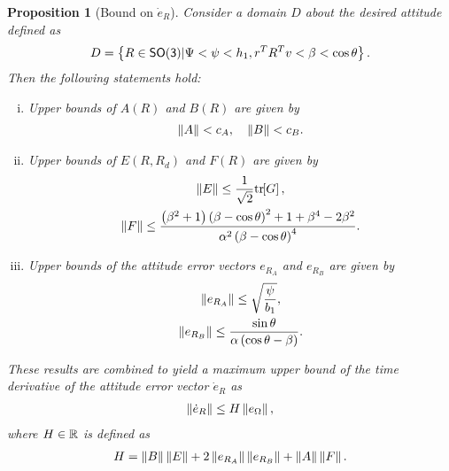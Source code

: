 \documentclass[letterpaper, 10 pt, conference]{ieeeconf}  %
\newtheorem{prop}{Proposition}
\begin{document}
\begin{prop}[Bound on \( \dot{e}_R \)]\label{prop:eR_dot_bound}
Consider a domain \( D \) about the desired attitude defined as
\begin{align}
	D = \left\{ R \in \mathsf{SO(3)} \vert \Psi < \psi < h_1, r^T R^T v < \beta < \cos \theta \right\}. \label{eqn:domain}
\end{align}
Then the following statements hold:
\begin{enumerate}[(i)]
	\item \label{item:prop_eR_dot_bound_AB} Upper bounds of \( A(R) \) and \( B(R) \) are given by
	\begin{gather}
		\left\| A \right\| < c_A  , \quad \left\| B \right\| < c_B . \label{eqn:AB_bound}
	\end{gather}
	\item \label{item:prop_eR_dot_bound_EF} Upper bounds of \( E(R,R_d) \) and \( F(R) \) are given by
	\begin{gather}
		\left\| E \right\| \leq \frac{1}{\sqrt{2}} \mathrm{tr}\negthickspace\left[ G \right]  , \label{eqn:E_bound} \\
		\left\| F \right\| \leq \frac{\left( \beta^2 + 1 \right)\left( \beta - \cos \theta \right)^2 + 1 + \beta^4-2 \beta^2}{\alpha^2 \left( \beta-\cos \theta \right)^4} . \label{eqn:F_bound}
	\end{gather}
	\item Upper bounds of the attitude error vectors \( e_{R_A} \) and \( e_{R_B} \) are given by
	\begin{gather}
		\left\| e_{R_A} \right\| \leq \sqrt{\frac{\psi}{b_1}}, \label{eqn:eRA_bound} \\
		\left\| e_{R_B} \right\| \leq \frac{\sin\theta}{\alpha \left( \cos \theta - \beta \right)}. \label{eqn:eRB_bound}
	\end{gather}
\end{enumerate}
These results are combined to yield a maximum upper bound of the time derivative of the attitude error vector \( \dot{e}_R \) as
\begin{gather}
	\left\| \dot{e}_R \right\| \leq H \left\| e_\Omega \right\| ,\label{eqn:eR_bound}
\end{gather}
where  \( H \in \mathbb{R} \) is defined as
\begin{gather}
	H = \left\| B \right\| \left\| E \right\| + 2 \left\| e_{R_A} \right\| \left\| e_{R_B} \right\| + \left\| A \right\|\left\| F \right\|. \label{eqn:H}
\end{gather}
\end{prop}
\end{document}
